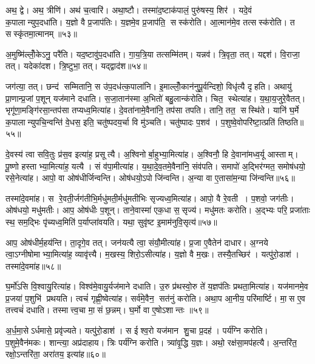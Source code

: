 अथ॒ द्वे। अथ॒ त्रीणि॑। अथ॑ च॒त्वारि॑। अथा॒ष्टौ। तस्मा॑द॒ष्टाक॑पालं॒ पुरु॑षस्य॒ शिर॑। यदे॒वं क॒पालान्युप॒दधा॑ति। य॒ज्ञो वै प्र॒जाप॑तिः। य॒ज्ञमे॒व प्र॒जाप॑ति॒ सस्क॑रोति। आ॒त्मान॑मे॒व तत्सस्क॑रोति। त सस्कृ॑तमा॒त्मानम्॥५३॥

अ॒मुष्मि॑ल्लोँ॒केऽनु॒ परै॑ति। यद॒ष्टावु॑प॒दधा॑ति। गा॒य॒त्रि॒या तत्सम्मि॑तम्। यन्नव॑। त्रि॒वृता॒ तत्। यद्दश॑। वि॒राजा॒ तत्। यदेका॑दश। त्रि॒ष्टुभा॒ तत्। यद्द्वाद॑श॥५४॥

जग॑त्या॒ तत्। छन्द॑ सम्मितानि॒ स उ॑प॒दध॑त्क॒पाला॑नि। इ॒माल्लोँ॒कान॑नुपू॒र्वन्दिशो॒ विधृ॑त्यै दृहति। अथायु॑ प्रा॒णान्प्र॒जां प॒शून् यज॑माने दधाति। स॒जा॒तान॑स्मा अ॒भितो॑ बहु॒लान्क॑रोति। चित॒ स्थेत्या॑ह। य॒था॒य॒जुरे॒वैतत्। भृगू॑णा॒मङ्गि॑रसा॒न्तप॑सा तप्यध्व॒मित्या॑ह। दे॒वता॑नामे॒वैना॑नि॒ तप॑सा तपति। तानि॒ तत॒ सस्थि॑ते। यानि॑ घ॒र्मे क॒पालान्युपचि॒न्वन्ति॑ वे॒धस॒ इति॒ चतु॑ष्पदय॒र्चा वि मु॑ञ्चति। चतु॑ष्पादः प॒शव॑। प॒शुष्वे॒वोपरि॑ष्टा॒त्प्रति॑ तिष्ठति॥५५॥\anuvakamend[व॒र्त॒य॒ति॒ दिव॑मे॒वैतेन॑ दृहति स॒म्भव॑ति॒ त सस्कृ॑तमा॒त्मान॒न्द्वाद॑श॒ सस्थि॑ते॒ त्रीणि॑ च]

दे॒वस्य॑ त्वा सवि॒तुः प्र॑स॒व इत्या॑ह॒ प्रसूत्यै। अ॒श्विनोर्बा॒हुभ्या॒मित्या॑ह। अ॒श्विनौ॒ हि दे॒वाना॑मध्व॒र्यू आस्ताम्। पू॒ष्णो हस्ताभ्या॒मित्या॑ह॒ यत्यै। सं व॑पा॒मीत्या॑ह। य॒था॒दे॒व॒तमे॒वैना॑नि॒ संव॑पति। समापो॑ अ॒द्भिर॑ग्मत॒ समोष॑धयो॒ रसे॒नेत्या॑ह। आपो॒ वा ओष॑धीर्जिन्वन्ति। ओष॑धयो॒ऽपो जि॑न्वन्ति। अ॒न्या वा ए॒तासा॑म॒न्या जि॑न्वन्ति॥५६॥

तस्मा॑दे॒वमा॑ह। स रे॒वती॒र्जग॑तीभि॒र्मधु॑मती॒र्मधु॑मतीभिः सृज्यध्व॒मित्या॑ह। आपो॒ वै रे॒वती। प॒शवो॒ जग॑तीः। ओष॑धयो॒ मधु॑मतीः। आप॒ ओष॑धीः प॒शून्। ताने॒वास्मा॑ एक॒धा स॒सृज्य॑। मधु॑मतः करोति। अ॒द्भ्यः परि॒ प्रजा॑ताः स्थ॒ सम॒द्भिः पृ॑च्यध्व॒मिति॑ प॒र्याप्ला॑वयति। यथा॒ सुवृ॑ष्ट इ॒माम॑नुवि॒सृत्य॑॥५७॥

आप॒ ओष॑धीर्म॒हय॑न्ति। ता॒दृगे॒व तत्। जन॑यत्यै त्वा॒ संयौ॒मीत्या॑ह। प्र॒जा ए॒वैतेन॑ दाधार। अ॒ग्नये त्वा॒ऽग्नीषोमाभ्या॒मित्या॑ह॒ व्यावृ॑त्त्यै। म॒खस्य॒ शिरो॒ऽसीत्या॑ह। य॒ज्ञो वै म॒खः। तस्यै॒तच्छिर॑। यत्पु॑रो॒डाश॑। तस्मा॑दे॒वमा॑ह॥५८॥

घ॒र्मो॑ऽसि वि॒श्वायु॒रित्या॑ह। विश्व॑मे॒वायु॒र्यज॑माने दधाति। उ॒रु प्र॑थस्वो॒रु ते॑ य॒ज्ञप॑तिः प्रथता॒मित्या॑ह। यज॑मानमे॒व प्र॒जया॑ प॒शुभि॑ प्रथयति। त्वचं॑ गृह्णी॒ष्वेत्या॑ह। सर्व॑मे॒वैन॒ सत॑नुं करोति। अथा॒प आ॒नीय॒ परि॑मार्ष्टि। मा॒स ए॒व तत्त्वचं॑ दधाति। तस्मात्त्व॒चा मा॒सं छ॒न्नम्। घ॒र्मो वा ए॒षोऽशान्तः ॥५९॥

अ॒र्ध॒मा॒सेऽर्धमासे॒ प्रवृ॑ज्यते। यत्पु॑रो॒डाश॑। स ईश्व॒रो यज॑मान शु॒चा प्र॒दह॑। पर्य॑ग्नि करोति। प॒शुमे॒वैन॑मकः। शान्त्या॒ अप्र॑दाहाय। त्रिः पर्य॑ग्नि करोति। त्र्या॑वृ॒द्धि य॒ज्ञः। अथो॒ रक्ष॑सा॒मप॑हत्यै। अ॒न्तरि॑त॒ रक्षो॒ऽन्तरि॑ता॒ अरा॑तय॒ इत्या॑ह॥६०॥

